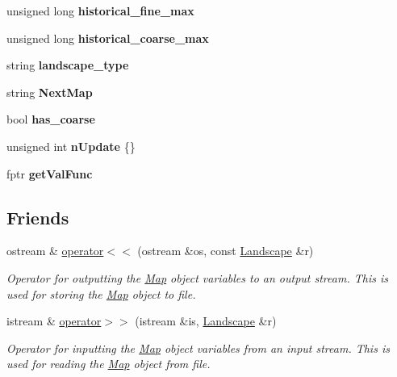 \begin{DoxyCompactItemize}
\item 
unsigned long {\bfseries historical\+\_\+fine\+\_\+max}\hypertarget{class_landscape_a86e67628c5ad3426f1f258e35ab5e4df}{}\label{class_landscape_a86e67628c5ad3426f1f258e35ab5e4df}

\item 
unsigned long {\bfseries historical\+\_\+coarse\+\_\+max}\hypertarget{class_landscape_aa79ae2cca59b135591c3cb978f14ee2a}{}\label{class_landscape_aa79ae2cca59b135591c3cb978f14ee2a}

\item 
string {\bfseries landscape\+\_\+type}\hypertarget{class_landscape_a2bed03fc250afab4f9341da6f1f6c0da}{}\label{class_landscape_a2bed03fc250afab4f9341da6f1f6c0da}

\item 
string {\bfseries Next\+Map}\hypertarget{class_landscape_a7e16bed309816971071c17ad0ebf94e5}{}\label{class_landscape_a7e16bed309816971071c17ad0ebf94e5}

\item 
bool {\bfseries has\+\_\+coarse}\hypertarget{class_landscape_a0389b53426acd490ec77f94d9897f130}{}\label{class_landscape_a0389b53426acd490ec77f94d9897f130}

\item 
unsigned int {\bfseries n\+Update} \{\}\hypertarget{class_landscape_ae4830197a96ec263ee533b65aac8d2e6}{}\label{class_landscape_ae4830197a96ec263ee533b65aac8d2e6}

\item 
fptr {\bfseries get\+Val\+Func}\hypertarget{class_landscape_a3cca2f0650d5979668f2a22753f965b9}{}\label{class_landscape_a3cca2f0650d5979668f2a22753f965b9}

\end{DoxyCompactItemize}
\subsection*{Friends}
\begin{DoxyCompactItemize}
\item 
ostream \& \hyperlink{class_landscape_a1c309185f0c3a601f27c932f1f2fa886}{operator$<$$<$} (ostream \&os, const \hyperlink{class_landscape}{Landscape} \&r)
\begin{DoxyCompactList}\small\item\em Operator for outputting the \hyperlink{class_map}{Map} object variables to an output stream. This is used for storing the \hyperlink{class_map}{Map} object to file. \end{DoxyCompactList}\item 
istream \& \hyperlink{class_landscape_a8b9beb241ad534346dc98d24f6bb9279}{operator$>$$>$} (istream \&is, \hyperlink{class_landscape}{Landscape} \&r)
\begin{DoxyCompactList}\small\item\em Operator for inputting the \hyperlink{class_map}{Map} object variables from an input stream. This is used for reading the \hyperlink{class_map}{Map} object from file. \end{DoxyCompactList}\end{DoxyCompactItemize}


